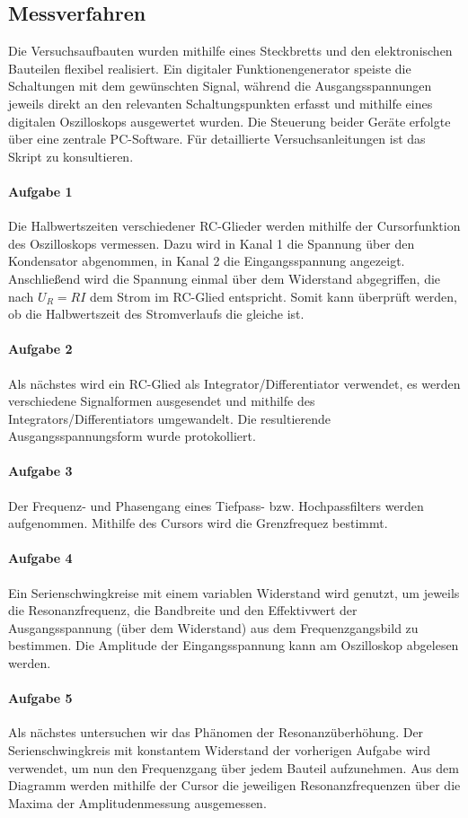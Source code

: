 \subsection{Messverfahren}
Die Versuchsaufbauten wurden mithilfe eines Steckbretts und den elektronischen Bauteilen flexibel realisiert. Ein digitaler Funktionengenerator speiste die Schaltungen mit dem gewünschten Signal, während die Ausgangsspannungen jeweils direkt an den relevanten Schaltungspunkten erfasst und mithilfe eines digitalen Oszilloskops ausgewertet wurden. Die Steuerung beider Geräte erfolgte über eine zentrale PC-Software. 
Für detaillierte Versuchsanleitungen ist das Skript\autocite{Skript_2.2} zu konsultieren.
\paragraph{Aufgabe 1}
Die Halbwertszeiten verschiedener RC-Glieder werden mithilfe der Cursorfunktion des Oszilloskops vermessen. Dazu wird in Kanal 1 die Spannung über den Kondensator abgenommen, in Kanal 2 die Eingangsspannung angezeigt. Anschließend wird die Spannung einmal über dem Widerstand abgegriffen, die nach \(U_R=RI\) dem Strom im RC-Glied entspricht. Somit kann überprüft werden, ob die Halbwertszeit des Stromverlaufs die gleiche ist. 
\paragraph{Aufgabe 2}
Als nächstes wird ein RC-Glied als Integrator/Differentiator verwendet, es werden verschiedene Signalformen ausgesendet und mithilfe des Integrators/Differentiators umgewandelt. Die resultierende Ausgangsspannungsform wurde protokolliert.  
\paragraph{Aufgabe 3}
Der Frequenz- und Phasengang eines Tiefpass- bzw. Hochpassfilters werden aufgenommen. Mithilfe des Cursors wird die Grenzfrequez bestimmt. 
\paragraph{Aufgabe 4}
Ein Serienschwingkreise mit einem variablen Widerstand wird genutzt, um jeweils die Resonanzfrequenz, die Bandbreite und den Effektivwert der Ausgangsspannung (über dem Widerstand) aus dem Frequenzgangsbild zu bestimmen. Die Amplitude der Eingangsspannung kann
am Oszilloskop abgelesen werden.
\paragraph{Aufgabe 5}
Als nächstes untersuchen wir das Phänomen der Resonanzüberhöhung. Der Serienschwingkreis mit konstantem Widerstand der vorherigen Aufgabe wird verwendet, um nun den Frequenzgang über jedem Bauteil aufzunehmen. Aus dem Diagramm werden mithilfe der Cursor die jeweiligen Resonanzfrequenzen über die Maxima der Amplitudenmessung ausgemessen.
